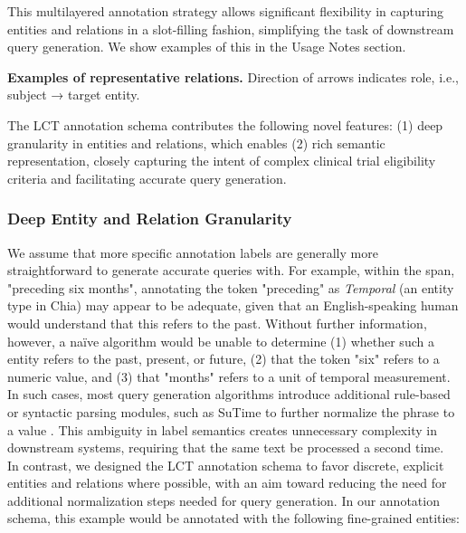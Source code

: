 \documentclass[../main.tex]{subfiles}
\begin{document}
\noindent This multilayered annotation strategy allows significant flexibility in capturing entities and relations in a slot-filling fashion, simplifying the task of downstream query generation. We show examples of this in the Usage Notes section. \\

\begin{table}[ht!]
    \centering
    
    \caption{\textbf{Examples of representative relations.} Direction of arrows indicates role, i.e., subject → target entity.}
    \label{tbl_relation_examples}
\end{table}

\noindent The LCT annotation schema contributes the following novel features: (1) deep granularity in entities and relations, which enables (2) rich semantic representation, closely capturing the intent of complex clinical trial eligibility criteria and facilitating accurate query generation.

\subsubsection*{Deep Entity and Relation Granularity}
\noindent We assume that more specific annotation labels are generally more straightforward to generate accurate queries with. For example, within the span, "preceding six months", annotating the token "preceding" as \textit{Temporal} (an entity type in Chia) may appear to be adequate, given that an English-speaking human would understand that this refers to the past. Without further information, however, a naïve algorithm would be unable to determine (1) whether such a entity refers to the past, present, or future, (2) that the token "six" refers to a numeric value, and (3) that "months" refers to a unit of temporal measurement. In such cases, most query generation algorithms introduce additional rule-based or syntactic parsing modules, such as SuTime \cite{chang2012sutime} to further normalize the phrase to a value \cite{weng2011elixr, yuan2019criteria2query}. This ambiguity in label semantics creates unnecessary complexity in downstream systems, requiring that the same text be processed a second time. \\

\noindent In contrast, we designed the LCT annotation schema to favor discrete, explicit entities and relations where possible, with an aim toward reducing the need for additional normalization steps needed for query generation. In our annotation schema, this example would be annotated with the following fine-grained entities: \\
\end{document}
